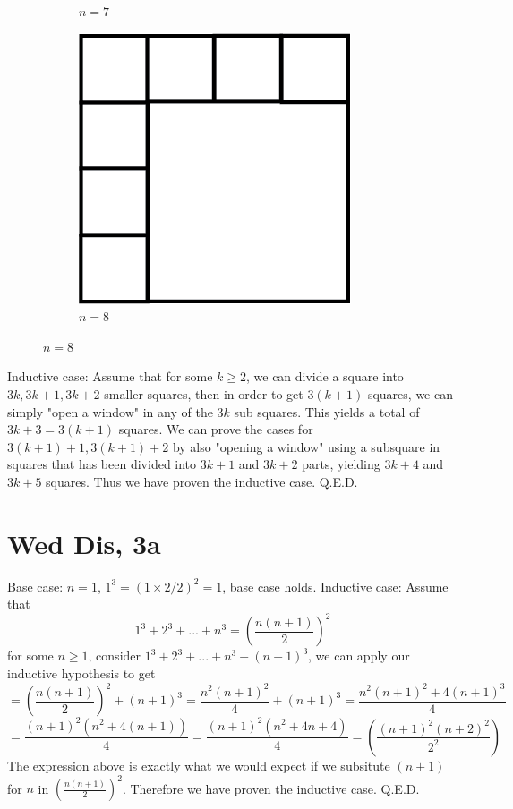 \documentclass[12pt]{article}
\begin{document}
\begin{figure}[h]
\begin{subfigure}[b]{0.3\textwidth}
         \caption{$n=7$}
     \end{subfigure}
     \hfill
     \begin{subfigure}[b]{0.3\textwidth}
         \centering
         \includegraphics[width=\textwidth]{GRAPH3}
         \caption{$n=8$}
         \label{fig:five over x}
     \end{subfigure}
\end{figure}
\newline
Inductive case: Assume that for some $k \geq 2$, we can divide a square into $3k, 3k+1, 3k+2$ smaller squares, then in order to get $3(k+1)$ squares, we can simply "open a window" in any of the $3k$ sub squares. This yields a total of $3k+3 = 3(k+1)$ squares.
\newline
We can prove the cases for $3(k+1)+1, 3(k+1)+2$ by also "opening a window" using a subsquare in squares that has been divided into $3k+1$ and $3k+2$ parts, yielding $3k+4$ and $3k+5$ squares.
\newline
Thus we have proven the inductive case. Q.E.D.
\newpage


\section{Wed Dis, 3a}
Base case: $n=1$, $1^3 = (1\times2/2)^2 = 1$, base case holds.
\newline
Inductive case: Assume that $$1^3 + 2^3 + ... + n^3 = (\frac{n(n+1)}{2})^2$$
for some $n \geq 1$, consider
$1^3 + 2^3 + ... + n^3 + (n+1)^3$, we can apply our inductive hypothesis to get
$$ = (\frac{n(n+1)}{2})^2 + (n+1)^3 = \frac{n^2(n+1)^2}{4} + (n+1)^3 = \frac{n^2(n+1)^2+4(n+1)^3}{4}$$
$$= \frac{(n+1)^2(n^2+4(n+1))}{4} = \frac{(n+1)^2(n^2+4n+4)}{4} = (\frac{(n+1)^2(n+2)^2}{2^2})$$
The expression above is exactly what we would expect if we subsitute $(n+1)$ for $n$ in $(\frac{n(n+1)}{2})^2$. Therefore we have proven the inductive case. Q.E.D.
\end{document}
